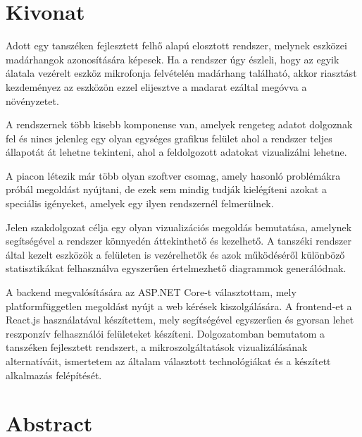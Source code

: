 \setcounter{page}{1}

\selecthungarian

\chapter*{Kivonat}

Adott egy tanszéken fejlesztett felhő alapú elosztott rendszer, melynek eszközei madárhangok azonosítására képesek.
Ha a rendszer úgy észleli, hogy az egyik álatala vezérelt eszköz mikrofonja felvételén madárhang található,
akkor riasztást kezdeményez az eszközön ezzel elijesztve a madarat ezáltal megóvva a növényzetet.

A rendszernek több kisebb komponense van, amelyek rengeteg adatot dolgoznak fel és nincs jelenleg egy olyan egységes grafikus felület ahol a rendszer teljes állapotát
át lehetne tekinteni, ahol a feldolgozott adatokat vizualizálni lehetne.

A piacon létezik már több olyan szoftver csomag, amely hasonló problémákra próbál megoldást nyújtani, de ezek sem mindig
tudják kielégíteni azokat a speciális igényeket, amelyek egy ilyen rendszernél felmerülnek.

Jelen szakdolgozat célja egy olyan vizualizációs megoldás bemutatása, amelynek segítségével a rendszer könnyedén áttekinthető
és kezelhető. A tanszéki rendszer által kezelt eszközök a felületen is vezérelhetők 
és azok működéséről különböző statisztikákat felhasználva egyszerűen értelmezhető diagrammok generálódnak.

A backend megvalósítására az ASP.NET Core-t választottam, mely platformfüggetlen megoldást nyújt a web kérések kiszolgálására.
A frontend-et a React.js használatával készítettem, mely segítségével egyszerűen és gyorsan lehet reszponzív felhasználói felületeket készíteni.
Dolgozatomban bemutatom a tanszéken fejlesztett rendszert, a mikroszolgáltatások vizualizálásának alternatíváit,
ismertetem az általam választott technológiákat és a készített alkalmazás felépítését.

\vfill
\selectenglish


\chapter*{Abstract}

